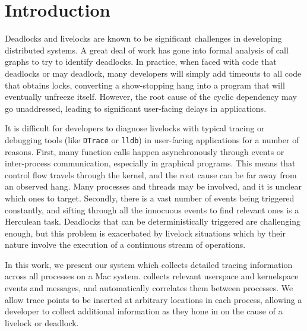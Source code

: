 \section{Introduction} \label{sec:intro}
%

%

Deadlocks and livelocks are known to be significant challenges in developing distributed systems.
A great deal of work has gone into formal analysis of call graphs to try to identify deadlocks.
In practice, when faced with code that deadlocks or may deadlock, many developers will simply add timeouts to all code that obtains locks,
converting a show-stopping hang into a program that will eventually unfreeze itself.
However, the root cause of the cyclic dependency may go unaddressed, leading to significant user-facing delays in applications.

It is difficult for developers to diagnose livelocks with typical tracing or debugging tools (like \texttt{DTrace} or \texttt{lldb})
in user-facing applications for a number of reasons.
First, many function calls happen asynchronously through events or inter-process communication, especially in graphical programs.
This means that control flow travels through the kernel, and the root cause can be far away from an observed hang.
Many processes and threads may be involved, and it is unclear which ones to target.
Secondly, there is a vast number of events being triggered constantly, and
sifting through all the innocuous events to find relevant ones is a Herculean task.
Deadlocks that can be deterministically triggered are challenging enough, but
this problem is exacerbated by livelock situations which by their nature involve the execution of a continuous stream of operations.

In this work, we present our system \textit{\sys} which collects detailed tracing information across all processes on a Mac system.
\sys collects relevant userspace and kernelspace events and messages, and automatically correlates them between processes.
We allow trace points to be inserted at arbitrary locations in each process,
allowing a developer to collect additional information as they hone in on the cause of a livelock or deadlock.

